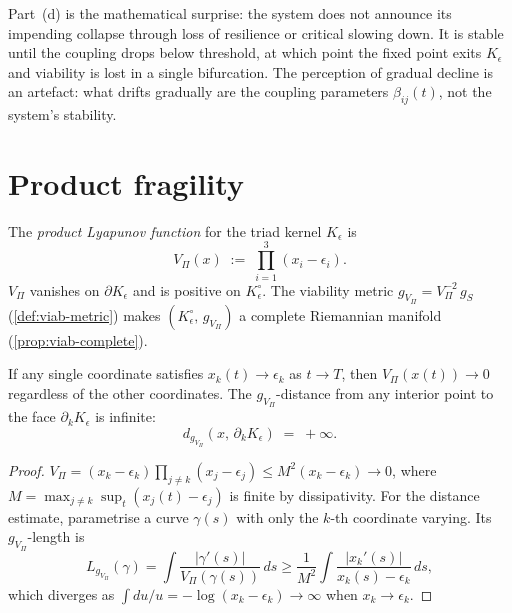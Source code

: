 Part~(d) is the mathematical surprise: the system does not
announce its impending collapse through loss of resilience or
critical slowing down.  It is stable until the coupling drops
below threshold, at which point the fixed point exits
$K_\epsilon$ and viability is lost in a single bifurcation.
The perception of gradual decline is an artefact: what drifts
gradually are the coupling parameters $\beta_{ij}(t)$, not the
system's stability.

\section{Product fragility}\label{sec:triad-fragility}

\begin{definition}\label{def:product-lyapunov}
The \emph{product Lyapunov function} for the triad kernel
$K_\epsilon$ is
\[
  V_\Pi(x) \;:=\; \prod_{i=1}^3 (x_i - \epsilon_i).
\]
$V_\Pi$ vanishes on $\partial K_\epsilon$ and is positive on
$K_\epsilon^\circ$.  The viability metric
$g_{V_\Pi} = V_\Pi^{-2}\, g_S$ (\cref{def:viab-metric}) makes
$(K_\epsilon^\circ,\, g_{V_\Pi})$ a complete Riemannian manifold
(\cref{prop:viab-complete}).
\end{definition}

\begin{proposition}\label{prop:single-collapse}
If any single coordinate satisfies
$x_k(t) \to \epsilon_k$ as $t \to T$, then
$V_\Pi(x(t)) \to 0$ regardless of the other coordinates.
The $g_{V_\Pi}$-distance from any interior point to the face
$\partial_k K_\epsilon$ is infinite:
\[
  d_{g_{V_\Pi}}(x,\, \partial_k K_\epsilon) \;=\; +\infty.
\]
\end{proposition}

\begin{proof}
$V_\Pi = (x_k - \epsilon_k) \prod_{j \neq k}(x_j - \epsilon_j)
\leq M^2 (x_k - \epsilon_k) \to 0$, where
$M = \max_{j \neq k} \sup_t (x_j(t) - \epsilon_j)$ is finite
by dissipativity.
For the distance estimate, parametrise a curve
$\gamma(s)$ with only the $k$-th coordinate varying.
Its $g_{V_\Pi}$-length is
\[
  L_{g_{V_\Pi}}(\gamma)
  = \int \frac{|\gamma'(s)|}{V_\Pi(\gamma(s))}\, ds
  \geq \frac{1}{M^2}
  \int \frac{|x_k'(s)|}{x_k(s) - \epsilon_k}\, ds,
\]
which diverges as
$\int du/u = -\log(x_k - \epsilon_k) \to \infty$
when $x_k \to \epsilon_k$.
\end{proof}

